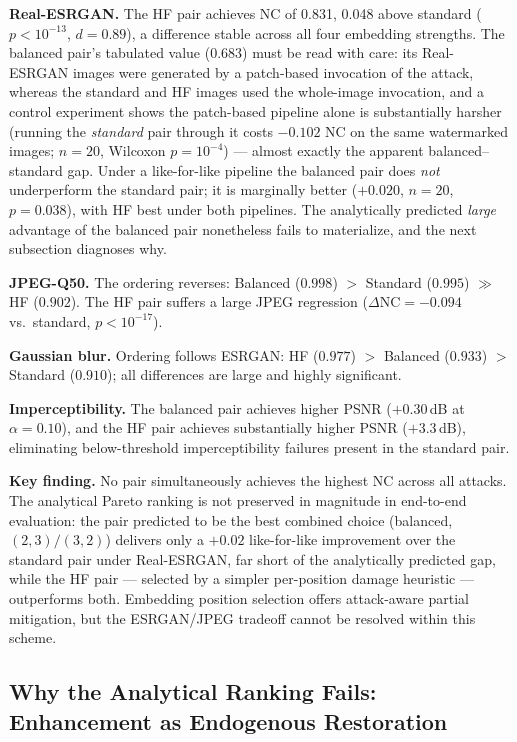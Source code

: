 \documentclass[conference]{IEEEtran}
\begin{document}
\textbf{Real-ESRGAN.} The HF pair achieves NC of 0.831, 0.048 above
standard ($p < 10^{-13}$, $d = 0.89$), a difference stable across all
four embedding strengths. The balanced pair's tabulated value (0.683)
must be read with care: its Real-ESRGAN images were generated by a
patch-based invocation of the attack, whereas the standard and HF images
used the whole-image invocation, and a control experiment shows the
patch-based pipeline alone is substantially harsher (running the
\emph{standard} pair through it costs $-0.102$ NC on the same
watermarked images; $n=20$, Wilcoxon $p=10^{-4}$) --- almost exactly the
apparent balanced--standard gap. Under a like-for-like pipeline the
balanced pair does \emph{not} underperform the standard pair; it is
marginally better ($+0.020$, $n=20$, $p=0.038$), with HF best under
both pipelines. The analytically predicted \emph{large} advantage of the
balanced pair nonetheless fails to materialize, and the next subsection
diagnoses why.

\textbf{JPEG-Q50.} The ordering reverses: Balanced ($0.998$) $>$ Standard
($0.995$) $\gg$ HF ($0.902$). The HF pair suffers a large JPEG regression
($\Delta\mathrm{NC} = -0.094$ vs.\ standard, $p < 10^{-17}$).

\textbf{Gaussian blur.} Ordering follows ESRGAN: HF ($0.977$) $>$
Balanced ($0.933$) $>$ Standard ($0.910$); all differences are large and
highly significant.

\textbf{Imperceptibility.} The balanced pair achieves higher PSNR
($+0.30$\,dB at $\alpha=0.10$), and the HF pair achieves substantially
higher PSNR ($+3.3$\,dB), eliminating below-threshold imperceptibility
failures present in the standard pair.

\textbf{Key finding.} No pair simultaneously achieves the highest NC
across all attacks. The analytical Pareto ranking is not preserved in
magnitude in end-to-end evaluation: the pair predicted to be the best
combined choice (balanced, $(2,3)/(3,2)$) delivers only a $+0.02$
like-for-like improvement over the standard pair under Real-ESRGAN,
far short of the analytically predicted gap, while the HF pair ---
selected by a simpler per-position damage heuristic --- outperforms
both. Embedding position selection offers attack-aware partial
mitigation, but the ESRGAN/JPEG tradeoff cannot be resolved within this
scheme.

\subsection{Why the Analytical Ranking Fails: Enhancement as Endogenous
Restoration}
\label{sec:margin}
\end{document}
